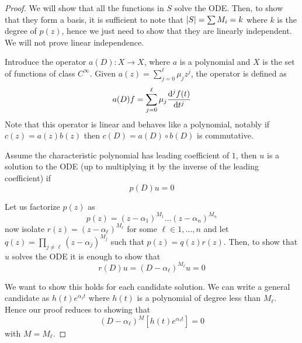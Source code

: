 \documentclass[12pt]{extarticle}
\numberwithin{equation}{section}
\begin{document}
\begin{proof}
    We will show that all the functions in $S$ solve the ODE.
    Then, to show that they form a basis, it is sufficient to note that
    $\abs{S} = \sum M_i = k$ where $k$ is the degree of $p(z)$,
    hence we just need to show that they are linearly independent.
    We will not prove linear independence.

    Introduce the operator $a(D) : X \to X$, where $a$ is a polynomial and
    $X$ is the set of functions of class $C^\infty$.
    Given $a(z) = \sum_{j= 0}^\ell \mu_j z^j$, the operator is defined as
    \begin{equation}
        a(D)f = \sum^{\ell}_{j = 0} \mu_j \dv[j]{f(t)}{t}
    \end{equation}
    Note that this operator is linear and behaves like a polynomial,
    notably if $c(z) = a(z)b(z)$ then $c(D) = a(D) \circ b(D)$ is commutative.

    Assume the characteristic polynomial has leading coefficient of $1$,
    then $u$ is a solution to the ODE (up to multiplying it by the inverse of the leading coefficient) if
    \begin{equation}
        p(D)u = 0
    \end{equation}

    Let us factorize $p(z)$ as
    \begin{equation}
        p(z) = (z-\alpha_1)^{M_1} \dots (z-\alpha_n)^{M_n}
    \end{equation}
    now isolate $r(z) = (z-\alpha_\ell)^{M_\ell}$ for some $\ell \in 1, \dots, n$
    and let $q(z) = \prod_{j \neq \ell} (z-\alpha_j)^{M_j}$
    such that $p(z) = q(z)r(z)$.
    Then, to show that $u$ solves the ODE it is enough to show that
    \begin{equation}
        r(D)u = (D - \alpha_\ell)^{M_\ell}u = 0
    \end{equation}

    We want to show this holds for each candidate solution.
    We can write a general candidate as $h(t) e^{\alpha_\ell t}$
    where $h(t)$ is a polynomial of degree less than $M_\ell$.
    Hence our proof reduces to showing that
    \begin{equation}
        (D - \alpha_\ell)^{M} [h(t) e^{\alpha_\ell t}] = 0
    \end{equation}
    with $M = M_\ell$.


\end{proof}
\end{document}
